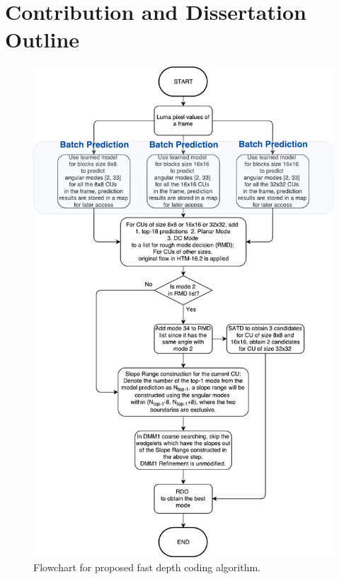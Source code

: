 \section{Contribution and Dissertation Outline}\label{sec:outline}
\begin{figure}
    \centering
    \includegraphics[width=\textwidth,height=\textheight,keepaspectratio]{Figures/proposed-fast-depth-coding-algorithm}
    \caption[Flowchart for proposed fast depth coding 
    algorithm]{Flowchart for proposed fast depth coding 
    algorithm.}\label{fig:proposed-fast-depth-coding-algorithm}
\end{figure}

